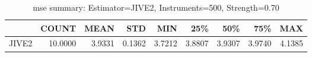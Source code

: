 \begin{table}[ht]
\centering
\caption{mse summary: Estimator=JIVE2, Instruments=500, Strength=0.70}
\begin{tabular}{lrrrrrrrr}
\toprule
 & COUNT & MEAN & STD & MIN & 25\% & 50\% & 75\% & MAX \\
\midrule
JIVE2 & 10.0000 & 3.9331 & 0.1362 & 3.7212 & 3.8807 & 3.9307 & 3.9740 & 4.1385 \\
\bottomrule
\end{tabular}
\end{table}
